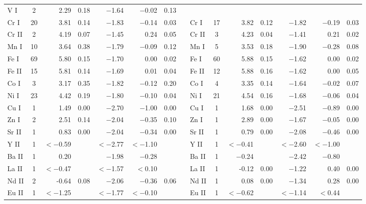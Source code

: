 \documentclass{emulateapj}
\begin{document}
\begin{longtable*}{lcrcrrcclcrcrrc}
   V \textsc{I} &   2 &    2.29 &    0.18 & $-$1.64 & $-$0.02 &    0.13 \\
  Cr \textsc{I} &  20 &    3.81 &    0.14 & $-$1.83 & $-$0.14 &    0.03 &&
  Cr \textsc{I} &  17 &    3.82 &    0.12 & $-$1.82 & $-$0.19 &    0.03 \\
 Cr \textsc{II} &   2 &    4.19 &    0.07 & $-$1.45 &    0.24 &    0.05 &&
 Cr \textsc{II} &   3 &    4.23 &    0.04 & $-$1.41 &    0.21 &    0.02 \\
  Mn \textsc{I} &  10 &    3.64 &    0.38 & $-$1.79 & $-$0.09 &    0.12 &&
  Mn \textsc{I} &   5 &    3.53 &    0.18 & $-$1.90 & $-$0.28 &    0.08 \\
  Fe \textsc{I} &  69 &    5.80 &    0.15 & $-$1.70 &    0.00 &    0.02 &&
  Fe \textsc{I} &  60 &    5.88 &    0.15 & $-$1.62 &    0.00 &    0.02 \\
 Fe \textsc{II} &  15 &    5.81 &    0.14 & $-$1.69 &    0.01 &    0.04 &&
 Fe \textsc{II} &  12 &    5.88 &    0.16 & $-$1.62 &    0.00 &    0.05 \\
  Co \textsc{I} &   3 &    3.17 &    0.35 & $-$1.82 & $-$0.12 &    0.20 &&
  Co \textsc{I} &   4 &    3.35 &    0.14 & $-$1.64 & $-$0.02 &    0.07 \\
  Ni \textsc{I} &  23 &    4.42 &    0.19 & $-$1.80 & $-$0.10 &    0.04 &&
  Ni \textsc{I} &  21 &    4.54 &    0.16 & $-$1.68 & $-$0.06 &    0.04 \\
  Cu \textsc{I} &   1 &    1.49 &    0.00 & $-$2.70 & $-$1.00 &    0.00 &&
  Cu \textsc{I} &   1 &    1.68 &    0.00 & $-$2.51 & $-$0.89 &    0.00 \\
  Zn \textsc{I} &   2 &    2.51 &    0.14 & $-$2.04 & $-$0.35 &    0.10 &&
  Zn \textsc{I} &   1 &    2.89 &    0.00 & $-$1.67 & $-$0.05 &    0.00 \\
 Sr \textsc{II} &   1 &    0.83 &    0.00 & $-$2.04 & $-$0.34 &    0.00 &&
 Sr \textsc{II} &   1 &    0.79 &    0.00 & $-$2.08 & $-$0.46 &    0.00 \\
  Y \textsc{II} &   1 &$<-$0.59 &         &$<-$2.77 &$<-$1.10 &         &&
  Y \textsc{II} &   1 &$<-$0.41 &         &$<-$2.60 &$<-$1.00 &         \\
 Ba \textsc{II} &   1 &    0.20 &         & $-$1.98 & $-$0.28 &         &&
 Ba \textsc{II} &   1 & $-$0.24 &         & $-$2.42 & $-$0.80 &         \\
 La \textsc{II} &   1 &$<-$0.47 &         &$<-$1.57 & $<$0.10 &         &&
 La \textsc{II} &   1 &   -0.12 &    0.00 & $-$1.22 &    0.40 &    0.00 \\
 Nd \textsc{II} &   2 &   -0.64 &    0.08 & $-$2.06 & $-$0.36 &    0.06 &&
 Nd \textsc{II} &   1 &    0.08 &    0.00 & $-$1.34 &    0.28 &    0.00 \\
 Eu \textsc{II} &   1 &$<-$1.25 &         &$<-$1.77 &$<-$0.10 &         &&
 Eu \textsc{II} &   1 &$<-$0.62 &         &$<-$1.14 & $<$0.44 &         \\


\end{longtable*}
\end{document}

